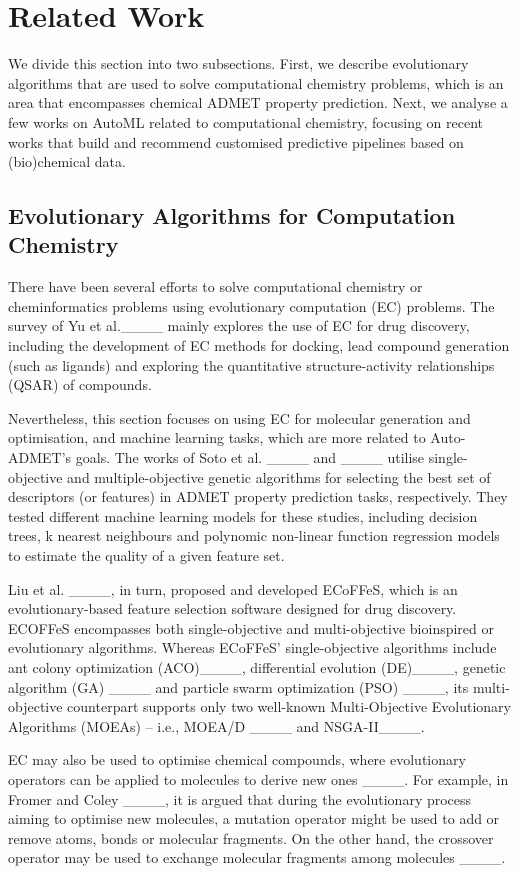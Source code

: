 \section{Related Work}
We divide this section into two subsections. First, we describe evolutionary algorithms that are used to solve computational chemistry problems, which is an area that encompasses chemical ADMET property prediction. Next, we analyse a few works on AutoML related to computational chemistry, focusing on recent works that build and recommend customised predictive pipelines based on (bio)chemical data.

\subsection{Evolutionary Algorithms for Computation Chemistry}

There have been several efforts to solve computational chemistry or cheminformatics problems using evolutionary computation (EC) problems. The survey of Yu et al.____ mainly explores the use of EC for drug discovery, including the development of EC methods for docking, lead compound generation (such as ligands) and exploring the quantitative structure-activity relationships (QSAR) of compounds. 

Nevertheless, this section focuses on using EC for molecular generation and optimisation, and machine learning tasks, which are more related to Auto-ADMET's goals. The works of Soto et al. ____ and ____ utilise single-objective and multiple-objective genetic algorithms for selecting the best set of descriptors (or features) in ADMET property prediction tasks, respectively. They tested different machine learning models for these studies, including decision trees, k nearest neighbours and polynomic non-linear function regression models to estimate the quality of a given feature set. 

Liu et al. ____, in turn, proposed and developed ECoFFeS, which is an evolutionary-based feature selection software designed for drug discovery. ECOFFeS encompasses both single-objective and multi-objective bioinspired or evolutionary algorithms. Whereas ECoFFeS' single-objective algorithms include ant colony optimization (ACO)____,  differential evolution (DE)____,  genetic algorithm (GA) ____ and particle swarm optimization (PSO) ____, its multi-objective counterpart supports only two well-known Multi-Objective Evolutionary Algorithms (MOEAs) -- i.e., MOEA/D ____ and NSGA-II____.

EC may also be used to optimise chemical compounds, where evolutionary operators can be applied to molecules to derive new ones ____. For example, in Fromer and Coley ____, it is argued that during the evolutionary process aiming to optimise new molecules, a mutation operator might be used to add or remove atoms, bonds or molecular fragments. On the other hand, the crossover operator may be used to exchange molecular fragments among molecules ____. 

